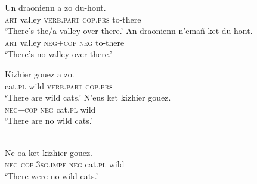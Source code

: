 ﻿\documentclass[output=paper]{langsci/langscibook}
\begin{document}
\begin{exe}\ex\label{ex:ieur-breton-valley}
\begin{xlist}
\ex\gll Un draonienn a zo du-hont. \\
\textsc{art} valley \textsc{verb.part} \textsc{cop.prs} to-there \\
    \glt `There's the/a valley over there.' 
\ex\gll An draonienn n’emañ ket du-hont.\\
\textsc{art} valley \textsc{neg+cop} \textsc{neg} to-there\\
\glt `There's no valley over there.' 
\end{xlist}
%
\ex\label{ex:ieur-breton-wildcats}
\begin{xlist}
\ex\gll Kizhier gouez a zo. \\
cat.\textsc{pl} wild \textsc{verb.part} \textsc{cop.prs} \\
    \glt `There are wild cats.'
\ex\gll N’eus ket kizhier gouez. \\
    \textsc{neg+cop} \textsc{neg} cat.\textsc{pl}   wild \\
    \glt `There are no wild cats.'
\end{xlist}
%
\ex\label{ex:ieur-breton-nowildcatspast}
\\
    \gll Ne oa ket kizhier gouez. \\
\textsc{neg} \textsc{cop.3sg.impf} \textsc{neg} cat.\textsc{pl} wild \\
    \glt `There were no wild cats.'
\end{exe}
\end{document}
